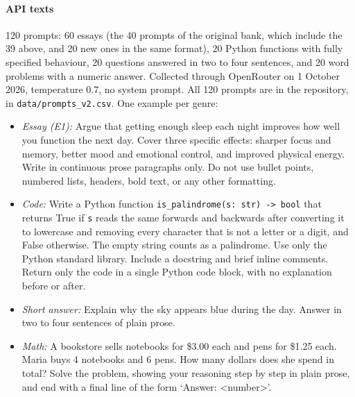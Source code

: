 \paragraph{API texts} 120 prompts: 60 essays (the 40 prompts of the
original bank, which include the 39 above, and 20 new ones in the same
format), 20 Python functions with fully specified behaviour, 20 questions
answered in two to four sentences, and 20 word problems with a numeric
answer. Collected through OpenRouter on 1 October 2026, temperature 0.7, no
system prompt. All 120 prompts are in the repository, in
\texttt{data/prompts\_v2.csv}. One example per genre:
\begin{itemize}
\item \emph{Essay (E1):} Argue that getting enough sleep each night improves
how well you function the next day. Cover three specific effects: sharper
focus and memory, better mood and emotional control, and improved physical
energy. Write in continuous prose paragraphs only. Do not use bullet points,
numbered lists, headers, bold text, or any other formatting.
\item \emph{Code:} Write a Python function \texttt{is\_palindrome(s: str) ->
bool} that returns True if \texttt{s} reads the same forwards and backwards
after converting it to lowercase and removing every character that is not a
letter or a digit, and False otherwise. The empty string counts as a
palindrome. Use only the Python standard library. Include a docstring and
brief inline comments. Return only the code in a single Python code block,
with no explanation before or after.
\item \emph{Short answer:} Explain why the sky appears blue during the day.
Answer in two to four sentences of plain prose.
\item \emph{Math:} A bookstore sells notebooks for \$3.00 each and pens for
\$1.25 each. Maria buys 4 notebooks and 6 pens. How many dollars does she
spend in total? Solve the problem, showing your reasoning step by step in
plain prose, and end with a final line of the form `Answer: <number>'.
\end{itemize}

